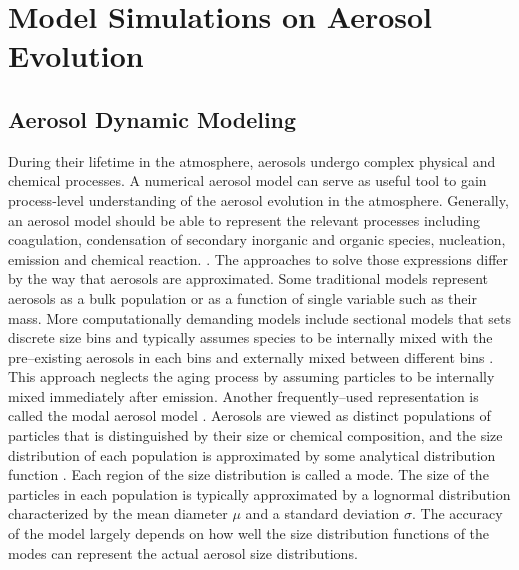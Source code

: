 \documentclass[12pt, fullpage]{uiucthesis2009}
\begin{document}
\newpage

	\section{Model Simulations on Aerosol Evolution}
		\subsection{Aerosol Dynamic Modeling}
		During their lifetime in the atmosphere, aerosols undergo complex physical and chemical processes. A numerical aerosol model can serve as useful tool to gain process-level understanding of the aerosol evolution in the atmosphere. Generally, an aerosol model should be able to represent the relevant processes including coagulation, condensation of secondary inorganic and organic species, nucleation, emission and chemical reaction. \citep{whitby1997}. The approaches to solve those expressions differ by the way that aerosols are approximated. Some traditional models represent aerosols as a bulk population or as a function of single variable such as their mass. More computationally demanding models include sectional models that sets discrete size bins and typically assumes species to be internally mixed with the pre--existing aerosols in each bins and externally mixed between different bins \citep[][]{jacobson2001strong,adams1999global}. This approach neglects the aging process by assuming particles to be internally mixed immediately after emission. Another frequently--used representation is called the modal aerosol model \citep[][]{whitby1997,Binkowski1995}. Aerosols are viewed as distinct populations of particles that is distinguished by their size or chemical composition, and the size distribution of each population is approximated by some analytical distribution function \citep{Binkowski1995}. Each region of the size distribution is called a mode. The size of the particles in each population is typically approximated by a lognormal distribution characterized by the mean diameter $\mu$ and a standard deviation $\sigma$. The accuracy of the model largely depends on how well the size distribution functions of the modes can represent the actual aerosol size distributions.  
		
\end{document}
